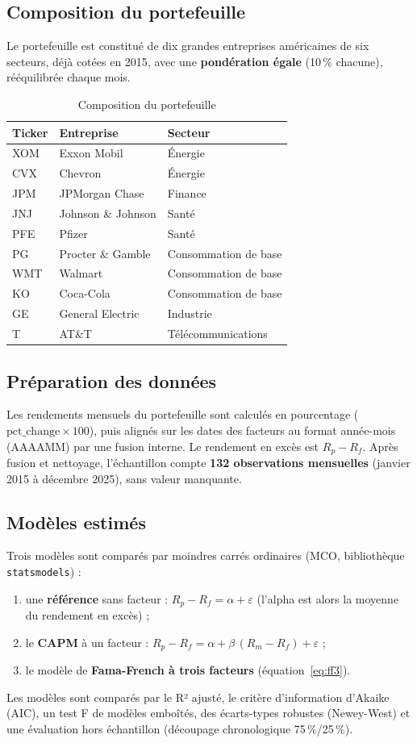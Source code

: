 \documentclass[11pt,a4paper]{article}
\newcommand{\Rp}{R_p}
\newcommand{\Rf}{R_f}
\begin{document}
\subsection{Composition du portefeuille}
Le portefeuille est constitué de dix grandes entreprises américaines de six secteurs, déjà cotées en 2015, avec une \textbf{pondération égale} (10\,\% chacune), rééquilibrée chaque mois.

\begin{table}[H]
\centering
\caption{Composition du portefeuille}
\begin{tabular}{lll}
\toprule
Ticker & Entreprise & Secteur \\
\midrule
XOM & Exxon Mobil & Énergie \\
CVX & Chevron & Énergie \\
JPM & JPMorgan Chase & Finance \\
JNJ & Johnson \& Johnson & Santé \\
PFE & Pfizer & Santé \\
PG & Procter \& Gamble & Consommation de base \\
WMT & Walmart & Consommation de base \\
KO & Coca-Cola & Consommation de base \\
GE & General Electric & Industrie \\
T & AT\&T & Télécommunications \\
\bottomrule
\end{tabular}
\end{table}

\subsection{Préparation des données}
Les rendements mensuels du portefeuille sont calculés en pourcentage ($\mathrm{pct\_change} \times 100$), puis alignés sur les dates des facteurs au format année-mois (AAAAMM) par une fusion interne. Le rendement en excès est $\Rp - \Rf$. Après fusion et nettoyage, l'échantillon compte \textbf{132 observations mensuelles} (janvier 2015 à décembre 2025), sans valeur manquante.

\subsection{Modèles estimés}
Trois modèles sont comparés par moindres carrés ordinaires (MCO, bibliothèque \texttt{statsmodels}) :
\begin{enumerate}
  \item une \textbf{référence} sans facteur : $\Rp - \Rf = \alpha + \varepsilon$ (l'alpha est alors la moyenne du rendement en excès) ;
  \item le \textbf{CAPM} à un facteur : $\Rp - \Rf = \alpha + \beta\,(R_m-\Rf)+\varepsilon$ ;
  \item le modèle de \textbf{Fama-French à trois facteurs} (équation~\ref{eq:ff3}).
\end{enumerate}
Les modèles sont comparés par le R² ajusté, le critère d'information d'Akaike (AIC), un test F de modèles emboîtés, des écarts-types robustes (Newey-West) et une évaluation hors échantillon (découpage chronologique 75\,\%/25\,\%).
\end{document}
